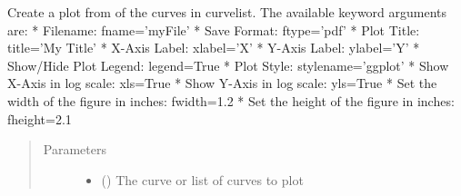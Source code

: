 \documentclass[letterpaper,10pt,english]{sphinxmanual}
\begin{document}
\begin{fulllineitems}
\label{\detokenize{pydv:pydvpy.create_plot}}
Create a plot from of the curves in curvelist. The available keyword arguments are:
* Filename: fname=’myFile’
* Save Format: ftype=’pdf’
* Plot Title: title=’My Title’
* X-Axis Label: xlabel=’X’
* Y-Axis Label: ylabel=’Y’
* Show/Hide Plot Legend: legend=True
* Plot Style: stylename=’ggplot’
* Show X-Axis in log scale: xls=True
* Show Y-Axis in log scale: yls=True
* Set the width of the figure in inches: fwidth=1.2
* Set the height of the figure in inches: fheight=2.1

\begin{sphinxVerbatim}[commandchars=\\\{\}]
  
\end{sphinxVerbatim}

\begin{sphinxVerbatim}[commandchars=\\\{\}]
   
\end{sphinxVerbatim}

\begin{sphinxVerbatim}[commandchars=\\\{\}]
           
\end{sphinxVerbatim}
\begin{quote}\begin{description}
\item[{Parameters}] \leavevmode\begin{itemize}
\item {} 
 () \textendash{} The curve or list of curves to plot


\end{itemize}
\end{description}
\end{quote}
\end{fulllineitems}
\end{document}
